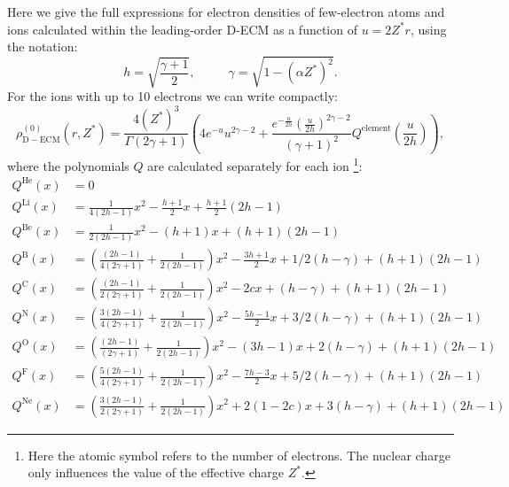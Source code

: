 Here we give the full expressions for electron densities of few-electron atoms and ions calculated within the leading-order D-ECM as a function of $u=2 Z^* r$, using the notation:
\begin{equation}
    h=\sqrt{\frac{\gamma+1}{2}},~~~~~~~~~~~~\gamma=\sqrt{1-(\alpha Z^*)^2}.
\end{equation}
 For the ions with up to 10 electrons we can write compactly:
\begin{equation}
    \rho_{\mathrm{D-ECM}}^{(0)}(r,Z^*) = \frac{4(Z^*)^3}{\Gamma (2 \gamma +1)} \left(4 e^{-u} u^{2 \gamma -2}+\frac{e^{-\frac{u}{2 h}} \left(\frac{u}{2h}\right)^{2 \gamma -2}}{(\gamma +1)^2}Q^{\mathrm{element}}\left(\frac{u}{2h}\right)\right),
\end{equation}
where the polynomials $Q$ are calculated separately for each ion \footnote{Here the atomic symbol refers to the number of electrons. The nuclear charge only influences the value of the effective charge $Z^*$.}:
\begin{subequations}
\begin{align}
     Q^{\mathrm{He}}(x) &= 0 
     \\
     Q^{\mathrm{Li}}(x) &= \frac{1}{4(2 h-1)}x^2-\frac{h+1}{2}x+\frac{h+1}{2} (2 h-1)
     \\
      Q^{\mathrm{Be}}(x) &= \frac{1}{2(2 h-1)}x^2-(h+1)x+(h+1) (2 h-1)
      \\
    Q^{\mathrm{B}}(x) &= \left(\frac{(2 h-1)}{4 (2 \gamma +1)}+\frac{1}{2(2h-1)}\right)x^2-\frac{3h+1}{2}x+1/2(h-\gamma)+(h+1) (2 h-1)
    \\
    Q^{\mathrm{C}}(x) &=\left(\frac{(2 h-1)}{2 (2 \gamma +1)}+\frac{1}{2(2h-1)}\right)x^2-2c x+(h-\gamma)+(h+1) (2 h-1)
    \\
    Q^{\mathrm{N}}(x) &= \left(\frac{3(2 h-1)}{4(2 \gamma +1)}+\frac{1}{2(2h-1)}\right)x^2-\frac{5h-1}{2}x+3/2(h-\gamma)+(h+1) (2 h-1)
    \\
    Q^{\mathrm{O}}(x) &= \left(\frac{(2 h-1)}{(2 \gamma +1)}+\frac{1}{2(2h-1)}\right)x^2-(3h-1)x+2(h-\gamma)+(h+1) (2 h-1)
    \\
    Q^{\mathrm{F}}(x) &= \left(\frac{5(2 h-1)}{4 (2 \gamma +1)}+\frac{1}{2(2h-1)}\right)x^2-\frac{7h-3}{2}x+5/2(h-\gamma)+(h+1) (2 h-1)
    \\
    Q^{\mathrm{Ne}}(x) &= \left(\frac{3(2 h-1)}{2 (2 \gamma +1)}+\frac{1}{2(2h-1)}\right)x^2+2(1-2c)x+3(h-\gamma)+(h+1) (2 h-1)
\end{align}
\end{subequations}

